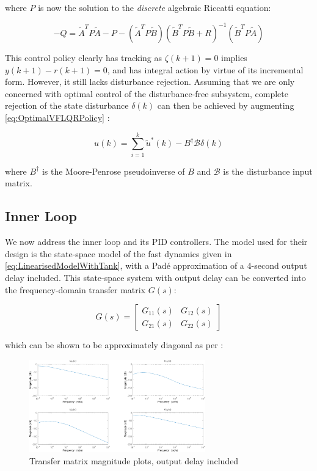 where $P$ is now the solution to the \textit{discrete} algebraic Riccatti equation:

\begin{equation}\label{eq:DARE}
	-Q = \tilde{A}^TP\tilde{A} - P - (\tilde{A}^TP\tilde{B})(\tilde{B}^TP\tilde{B}+R)^{-1}(\tilde{B}^TP\tilde{A})
\end{equation}

This control policy clearly has tracking as $\zeta(k+1) = 0$ implies $y(k+1)-r(k+1) = 0$, and has integral action by virtue of its incremental form. However, it still lacks disturbance rejection. Assuming that we are only concerned with optimal control of the disturbance-free subsystem, complete rejection of the state disturbance $\delta(k)$ can then be achieved by augmenting \cref{eq:OptimalVFLQRPolicy} \cite{Singh2017}:

\begin{equation}
	u(k) = \sum_{i=1}^{k} \tilde{u}^*(k) - B^\dagger \mathcal{B}\delta(k)
\end{equation}

where $B^\dagger$ is the Moore-Penrose pseudoinverse of $B$ and $\mathcal{B}$ is the disturbance input matrix.

\subsection{Inner Loop}\label{subsec:InnerLoop}

We now address the inner loop and its PID controllers. The model used for their design is the state-space model of the fast dynamics given in \cref{eq:LinearisedModelWithTank}, with a Padé approximation of a $4$-second output delay included. This state-space system with output delay can be converted into the frequency-domain transfer matrix $G(s)$:

\begin{equation}\label{eq:TransferMatrix}
	G(s) = \begin{bmatrix} G_{11}(s) & G_{12}(s) \\ G_{21}(s) & G_{22}(s)\end{bmatrix}
\end{equation}

which can be shown to be approximately diagonal as per :

\begin{figure}[h!]
 	\centering
 	\includegraphics[width=\linewidth,height=4cm]{Graphics/BodeMagDelayPlot.pdf}
 	\caption{Transfer matrix magnitude plots, output delay included}
 	\label{fig:BodeMagDelayPlot}
\end{figure}

